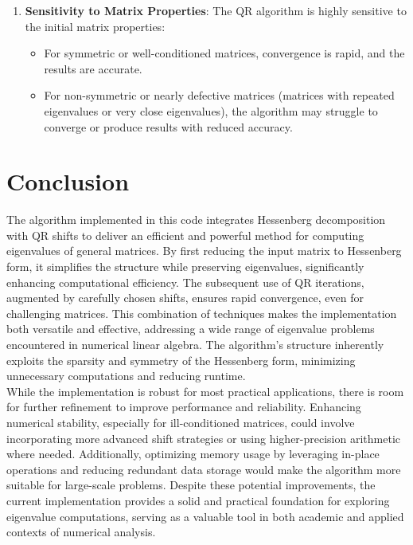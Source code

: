 \documentclass[a4paper,11pt,oneside]{report}
\begin{document}
\begin{enumerate}
    \item \textbf{Sensitivity to Matrix Properties}: The QR algorithm is highly sensitive to the initial matrix properties:
    \begin{itemize}
        \item For symmetric or well-conditioned matrices, convergence is rapid, and the results are accurate.
        \item For non-symmetric or nearly defective matrices (matrices with repeated eigenvalues or very close eigenvalues), the algorithm may struggle to converge or produce results with reduced accuracy.
    \end{itemize}
\end{enumerate} 


\chapter{ Conclusion}
The algorithm implemented in this code integrates Hessenberg decomposition with QR shifts to deliver an efficient and powerful method for computing eigenvalues of general matrices. By first reducing the input matrix to Hessenberg form, it simplifies the structure while preserving eigenvalues, significantly enhancing computational efficiency. The subsequent use of QR iterations, augmented by carefully chosen shifts, ensures rapid convergence, even for challenging matrices. This combination of techniques makes the implementation both versatile and effective, addressing a wide range of eigenvalue problems encountered in numerical linear algebra. The algorithm’s structure inherently exploits the sparsity and symmetry of the Hessenberg form, minimizing unnecessary computations and reducing runtime.
\\

While the implementation is robust for most practical applications, there is room for further refinement to improve performance and reliability. Enhancing numerical stability, especially for ill-conditioned matrices, could involve incorporating more advanced shift strategies or using higher-precision arithmetic where needed. Additionally, optimizing memory usage by leveraging in-place operations and reducing redundant data storage would make the algorithm more suitable for large-scale problems. Despite these potential improvements, the current implementation provides a solid and practical foundation for exploring eigenvalue computations, serving as a valuable tool in both academic and applied contexts of numerical analysis.
    
\end{document}
